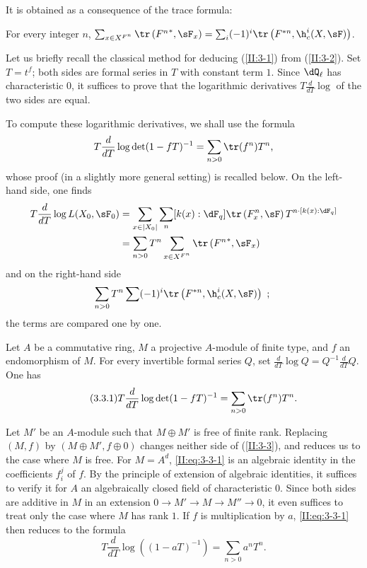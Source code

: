 It is obtained as a consequence of the trace formula:






\begin{theorem_}\label{II:3-2}
For every integer $n$,
$\sum_{x\in X^{F^n}} \tr\left({F^n}^*,\sF_x\right) = \sum_i (-1)^i \tr\left(F^{*n},\h_c^i(X,\sF)\right)$.
\end{theorem_}






Let us briefly recall the classical method for deducing (\ref{II:3-1}) from
(\ref{II:3-2}). Set $T=t^f$; both sides are formal series in $T$ with
constant term $1$. Since $\dQ_\ell$ has characteristic $0$, it suffices to
prove that the logarithmic derivatives $T\frac{d}{dT}\log$ of the two sides
are equal.

To compute these logarithmic derivatives, we shall use the formula
\[
  T \frac{d}{dT}\log\det(1-f T)^{-1} = \sum_{n>0} \tr(f^n) T^n \text{,}
\]
whose proof (in a slightly more general setting) is recalled below. On the
left-hand side, one finds
\begin{align*}
  T\frac{d}{dT}\log L(X_0,\sF_0)
    &= \sum_{x\in |X_0|} \sum_n [k(x):\dF_q] \tr\left(F_x^n,\sF\right) T^{n\cdot[k(x):\dF_q]} \\
    &= \sum_{n>0} T^n \sum_{x\in X^{F^n}} \tr\left({F^n}^*,\sF_x\right)
\end{align*}
and on the right-hand side
\[
  \sum_{n>0} T^n \sum (-1)^i \tr\left(F^{*n},\h_c^i(X,\sF)\right) \text{ ; }
\]
the terms are compared one by one.






\begin{proposition_}\label{II:3-3}
Let $A$ be a commutative ring, $M$ a projective $A$-module of finite type,
and $f$ an endomorphism of $M$. For every invertible formal series $Q$, set
$\frac{d}{dT}\log Q = Q^{-1}\frac{d}{dT}Q$. One has
\begin{equation*}\tag{3.3.1}\label{II:eq:3-3-1}
  T\frac{d}{dT}\log\det(1-f T)^{-1} = \sum_{n>0} \tr(f^n) T^n \text{.}
\end{equation*}
\end{proposition_}

Let $M'$ be an $A$-module such that $M\oplus M'$ is free of finite rank.
Replacing $(M,f)$ by $(M\oplus M',f\oplus 0)$ changes neither side of
(\ref{II:3-3}), and reduces us to the case where $M$ is free. For $M=A^d$,
\eqref{II:eq:3-3-1} is an algebraic identity in the coefficients $f_i^j$ of
$f$. By the principle of extension of algebraic identities, it suffices to
verify it for $A$ an algebraically closed field of characteristic $0$. Since
both sides are additive in $M$ in an extension
$0\to M'\to M\to M''\to 0$, it even suffices to treat only the case where
$M$ has rank $1$. If $f$ is multiplication by $a$,
\eqref{II:eq:3-3-1} then reduces to the formula
\[
  T\frac{d}{dT}\log\left((1-a T)^{-1}\right) = \sum_{n>0} a^n T^n \text{.}
\]






